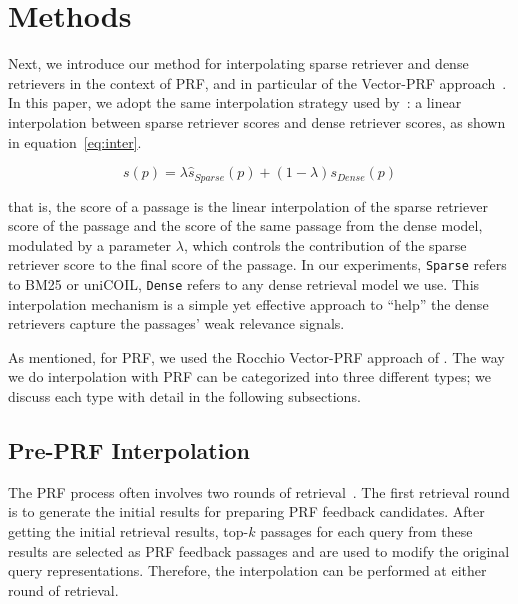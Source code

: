 \section{Methods}

Next, we introduce our method for interpolating sparse retriever and dense retrievers in the context of PRF, and in particular of the Vector-PRF approach~\cite{li2021pseudo}. In this paper, we adopt the same interpolation strategy used by~\citet{wang2021bert}: a linear interpolation between sparse retriever scores and dense retriever scores, as shown in equation~\ref{eq:inter}.

\begin{equation}
	\label{eq:inter}
	s(p) = \lambda\hat{s}_{Sparse}(p) + (1 - \lambda)s_{Dense}(p)
\end{equation}

\noindent that is, the score of a passage is the linear interpolation of the sparse retriever score of the passage and the score of the same passage from the dense model, modulated by a parameter $\lambda$, which controls the contribution of the sparse retriever score to the final score of the passage. In our experiments, \texttt{Sparse} refers to BM25 or uniCOIL, \texttt{Dense} refers to any dense retrieval model we use. This interpolation mechanism is a simple yet effective approach to ``help'' the dense retrievers capture the passages' weak relevance signals.


As mentioned, for PRF, we used the Rocchio Vector-PRF approach of \citet{li2021pseudo}.
The way we do interpolation with PRF can be categorized into three different types; we discuss each type with detail in the following subsections.

\subsection{Pre-PRF Interpolation}

The PRF process often involves two rounds of retrieval~\cite{li2021pseudo}. The first retrieval round is to generate the initial results for preparing PRF feedback candidates. After getting the initial retrieval results, top-$k$ passages for each query from these results are selected as PRF feedback passages and are used to modify the original query representations. Therefore, the interpolation can be performed at either round of retrieval.

